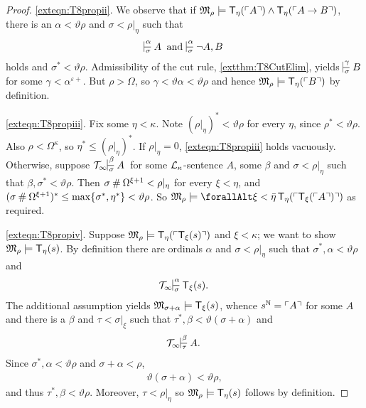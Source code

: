 \documentclass[UKenglish,cleveref,DIV=12]{scrartcl}
\let\forall\forallAlt
\theoremstyle{definition}
\theoremstyle{definition}
\begin{document}
\begin{proof}

\ref{exteqn:T8propii}. We observe that if $\mathfrak M_\rho\models
\mathsf{T}_\eta(\ulcorner{A}\urcorner)\land\mathsf{T}_\eta(\ulcorner{A\rightarrow B}\urcorner)$, there is an
$\alpha<\vartheta\rho$ and $\sigma<\rho|_\eta$ such that
\begin{align*}
 \prov{\alpha}\sigma{A}\text{ and }\prov{\alpha}\sigma{\lnot A,B}
\end{align*}
holds and $\sigma^*<\vartheta\rho$. Admissibility of the cut rule, \cref{extthm:T8CutElim}, yields
$\prov{\gamma}\sigma{B}$ for some $\gamma<\alpha^{\varepsilon+}$. But $\rho>\Omega$, so $\gamma<\vartheta\alpha<\vartheta\rho$ and hence $\mathfrak M_\rho\models \mathsf{T}_\eta(\ulcorner{B}\urcorner)$ by definition.

\ref{exteqn:T8propiii}. Fix some $\eta<\kappa$. Note $(\rho|_\eta)^*<\vartheta\rho$ for every $\eta$, since $\rho^*<\vartheta\rho$. Also $\rho<\Omega^\kappa$, so $\eta^*\le(\rho|_\eta)^*$. If $\rho|_\eta=0$,
\ref{exteqn:T8propiii} holds vacuously. Otherwise, suppose $\Tinfty\prov\beta\sigma A$ for some $\mathcal{L}_\kappa$-sentence $A$, some $\beta$ and $\sigma<\rho|_\eta$ such that $\beta,\sigma^*<\vartheta\rho$. Then $\sigma\mathbin{\#}\Omega^{\xi+1}<\rho|_\eta$ for every $\xi<\eta$, and $(\sigma\mathbin{\#}\Omega^{\xi+1})^*\le\max\{\sigma^*,\eta^*\}<\vartheta\rho$. So $\mathfrak M_\rho\models\forall\xi<\bar\eta\,\T_\eta(\gn{\T_\xi(\gn A)})$ as required.

\ref{exteqn:T8propiv}. Suppose $ \mathfrak M_\rho\models \mathsf{T}_\eta(\ulcorner{\mathsf{T}_\xi(s)}\urcorner)$ and $\xi<\kappa$; we want to show $\mathfrak M_\rho\models \mathsf{T}_\eta(s)$. By definition there are ordinals $\alpha$ and $\sigma<\rho|_\eta$ such that $\sigma^*,\alpha<\vartheta\rho$ and
\begin{align*}%
 \Tinfty\prov{\alpha}{\sigma}{\T_\xi(s).}
\end{align*}
The additional assumption yields $\mathfrak{M}_{\sigma+\alpha}\models \mathsf{T}_\xi(s)$, whence $s^\mathbb N=\ulcorner{A}\urcorner$ for some $A$ and there is a $\beta$ and $\tau<\sigma|_\xi$ such that $\tau^*,\beta<\vartheta(\sigma+\alpha)$ and
\begin{align*}
  \Tinfty\prov\beta\tau {A.}
\end{align*}
Since $\sigma^*,\alpha<\vartheta\rho$ and $\sigma+\alpha<\rho$,
\begin{align*}
  \vartheta(\sigma+\alpha)< \vartheta\rho,
\end{align*}
and thus $\tau^*,\beta<\vartheta\rho$. Moreover, $\tau<\rho|_\eta$ so
$\mathfrak M_\rho\models \mathsf{T}_\eta(s)$ follows by definition.


\end{proof}
\end{document}
